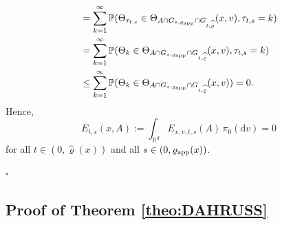 \documentclass[sn-mathphys-num]{sn-jnl}%
\theoremstyle{thmstyleone}%
\theoremstyle{thmstyletwo}%
\theoremstyle{thmstylethree}%
\newcommand{\rhoapp}{\varrho_{{\rm app}}}
\begin{document}
\begin{appendices}
\begin{enumerate}
{\begin{align*}
        &=\sum_{k=1}^\infty \mathbb{P}(\Theta_{\tau_{t,s}}\in \Theta_{A\cap G_{s,\varrho_{\textmd{app}}}\cap G_{t,\widehat{\varrho}}}(x,v), \tau_{t,s}=k) \\
        &=\sum_{k=1}^\infty \mathbb{P}(\Theta_{k}\in \Theta_{A\cap G_{s,\varrho_{\textmd{app}}}\cap G_{t,\widehat{\varrho}}}(x,v), \tau_{t,s}=k) \\
        &\leq \sum_{k=1}^\infty \mathbb P(\Theta_k\in \Theta_{A\cap G_{s,\varrho_{\textmd{app}}}\cap G_{t,\widehat{\varrho}}}(x,v)) = 0.
    \end{align*}
    Hence, 
    \[
    E_{t,s}(x,A):=\int_{\mathbb R^d} E_{x,v,t,s}(A) \, \pi_0(\mathrm{d} v)=0
    \]
    for all $t\in(0,\widehat{\varrho}(x))$ and all $s\in(0, \rhoapp(x))$.
    }
    
\end{enumerate}
    
\begin{flushright}    
$\square$
\end{flushright}




\subsection{Proof of Theorem \ref{theo:DAHRUSS}}
\label{app:DAHRUSS}


\end{appendices}
\end{document}
